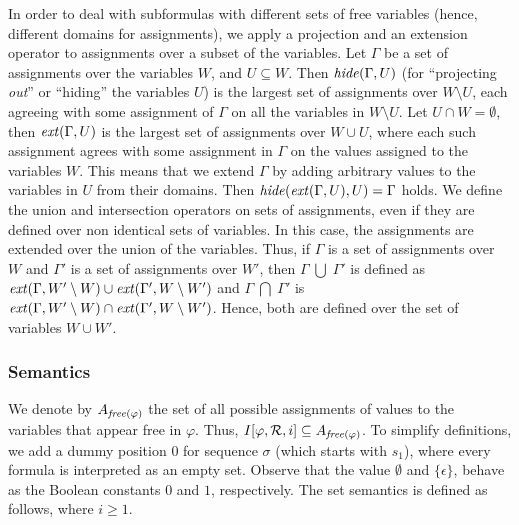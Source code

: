 In order to deal with subformulas with different sets of free
variables (hence, different domains for assignments), 
we apply a projection and an extension operator to assignments
over a subset of the variables. Let $\Gamma$ be
a set of assignments over the variables $W$, and
$U \subseteq W$.
Then $\mathit{hide} ( \Gamma , U )$ (for ``projecting {\em out}'' or  ``hiding''
the variables $U$)
is the largest set of assignments over 
$W \setminus U$, 
each agreeing with some
assignment of $\Gamma$ on all the variables in $W \setminus U$.
Let $U \cap W = \emptyset$, then
$\mathit{ext} ( \Gamma , U )$ is the largest set of assignments
over $W \cup U$, where each such assignment agrees 
with some assignment in $\Gamma$ on the
values assigned to the variables $W$. 
This means that we extend $\Gamma$ by
adding arbitrary values to the variables in $U$ from their domains.
Then $\mathit{hide} ( \mathit{ext} ( \Gamma , U ) , U ) = \Gamma$ holds.
We define the union and intersection operators on sets of
assignments, even if they are defined over non identical
sets of variables. 
In this case, the assignments are extended
over the union of the variables. Thus, if $\Gamma$ is a
set of assignments over $W$ and $\Gamma'$ is
a set of assignments over $W'$, then
$\Gamma \; \bigcup \;  \Gamma'$ is defined as $\mathit{ext} (\Gamma , W' \setminus W ) \cup
\mathit{ext} ( \Gamma' , W \setminus W' )$ and
$\Gamma \; \bigcap \; \Gamma'$ is $\mathit{ext} (\Gamma , W' \setminus W ) \cap
\mathit{ext} ( \Gamma' , W \setminus W' )$.  Hence, both are defined
over the set of variables $W \cup W'$.



\fi


\subsubsection{Semantics}

We denote by $A_{\mathit{free} ( \varphi )}$ the set of all possible assignments
of values to the variables that appear free
in $\varphi$. Thus,
$I [ \varphi, {\cal R} , i] \subseteq A_{\mathit{free} ( \varphi )}$.
To simplify definitions, we add
a dummy position $0$ for sequence $\sigma$ (which starts with $s_1$), 
where every formula is interpreted as an empty set.
Observe that the value $\emptyset$ and $\{ \epsilon \}$, behave
as the Boolean constants $0$ and $1$, respectively.
The set semantics is defined as follows, where $i \ge 1$.

